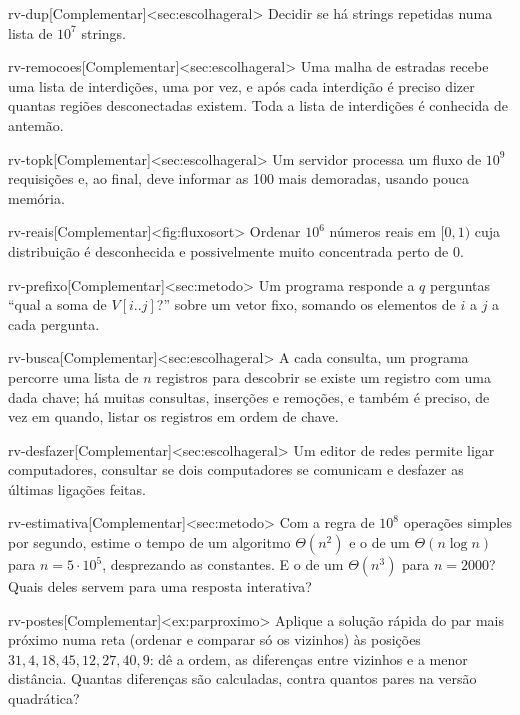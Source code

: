 \begin{exercicio}{rv-dup}[Complementar]<sec:escolhageral>
Decidir se há strings repetidas numa lista de $10^7$ strings.
\end{exercicio}
\begin{exercicio}{rv-remocoes}[Complementar]<sec:escolhageral>
Uma malha de estradas recebe uma lista de interdições, uma por vez, e após cada interdição é preciso dizer quantas regiões desconectadas existem. Toda a lista de interdições é conhecida de antemão.
\end{exercicio}
\begin{exercicio}{rv-topk}[Complementar]<sec:escolhageral>
Um servidor processa um fluxo de $10^9$ requisições e, ao final, deve informar as 100 mais demoradas, usando pouca memória.
\end{exercicio}
\begin{exercicio}{rv-reais}[Complementar]<fig:fluxosort>
Ordenar $10^6$ números reais em $[0,1)$ cuja distribuição é desconhecida e possivelmente muito concentrada perto de 0.
\end{exercicio}
\begin{exercicio}{rv-prefixo}[Complementar]<sec:metodo>
Um programa responde a $q$ perguntas ``qual a soma de $V[i..j]$?'' sobre um vetor fixo, somando os elementos de $i$ a $j$ a cada pergunta.
\end{exercicio}
\begin{exercicio}{rv-busca}[Complementar]<sec:escolhageral>
A cada consulta, um programa percorre uma lista de $n$ registros para descobrir se existe um registro com uma dada chave; há muitas consultas, inserções e remoções, e também é preciso, de vez em quando, listar os registros em ordem de chave.
\end{exercicio}
\begin{exercicio}{rv-desfazer}[Complementar]<sec:escolhageral>
Um editor de redes permite ligar computadores, consultar se dois computadores se comunicam e desfazer as últimas ligações feitas.
\end{exercicio}
\begin{exercicio}{rv-estimativa}[Complementar]<sec:metodo>
Com a regra de $10^8$ operações simples por segundo, estime o tempo de um algoritmo $\Theta(n^2)$ e o de um $\Theta(n\log n)$ para $n=5\cdot10^5$, desprezando as constantes. E o de um $\Theta(n^3)$ para $n=2000$? Quais deles servem para uma resposta interativa?
\end{exercicio}
\begin{exercicio}{rv-postes}[Complementar]<ex:parproximo>
Aplique a solução rápida do par mais próximo numa reta (ordenar e comparar só os vizinhos) às posições $31,4,18,45,12,27,40,9$: dê a ordem, as diferenças entre vizinhos e a menor distância. Quantas diferenças são calculadas, contra quantos pares na versão quadrática?
\end{exercicio}
